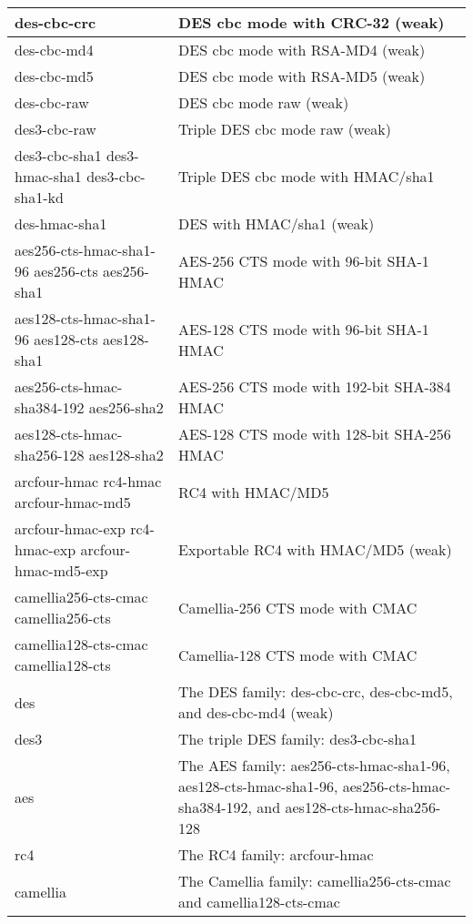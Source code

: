 \documentclass[letterpaper,10pt,english]{sphinxmanual}
\begin{document}
\begin{tabulary}{\linewidth}{|L|L|}
\hline

des-cbc-crc
 & 
DES cbc mode with CRC-32 (weak)
\\
\hline
des-cbc-md4
 & 
DES cbc mode with RSA-MD4 (weak)
\\
\hline
des-cbc-md5
 & 
DES cbc mode with RSA-MD5 (weak)
\\
\hline
des-cbc-raw
 & 
DES cbc mode raw (weak)
\\
\hline
des3-cbc-raw
 & 
Triple DES cbc mode raw (weak)
\\
\hline
des3-cbc-sha1 des3-hmac-sha1 des3-cbc-sha1-kd
 & 
Triple DES cbc mode with HMAC/sha1
\\
\hline
des-hmac-sha1
 & 
DES with HMAC/sha1 (weak)
\\
\hline
aes256-cts-hmac-sha1-96 aes256-cts aes256-sha1
 & 
AES-256 CTS mode with 96-bit SHA-1 HMAC
\\
\hline
aes128-cts-hmac-sha1-96 aes128-cts aes128-sha1
 & 
AES-128 CTS mode with 96-bit SHA-1 HMAC
\\
\hline
aes256-cts-hmac-sha384-192 aes256-sha2
 & 
AES-256 CTS mode with 192-bit SHA-384 HMAC
\\
\hline
aes128-cts-hmac-sha256-128 aes128-sha2
 & 
AES-128 CTS mode with 128-bit SHA-256 HMAC
\\
\hline
arcfour-hmac rc4-hmac arcfour-hmac-md5
 & 
RC4 with HMAC/MD5
\\
\hline
arcfour-hmac-exp rc4-hmac-exp arcfour-hmac-md5-exp
 & 
Exportable RC4 with HMAC/MD5 (weak)
\\
\hline
camellia256-cts-cmac camellia256-cts
 & 
Camellia-256 CTS mode with CMAC
\\
\hline
camellia128-cts-cmac camellia128-cts
 & 
Camellia-128 CTS mode with CMAC
\\
\hline
des
 & 
The DES family: des-cbc-crc, des-cbc-md5, and des-cbc-md4 (weak)
\\
\hline
des3
 & 
The triple DES family: des3-cbc-sha1
\\
\hline
aes
 & 
The AES family: aes256-cts-hmac-sha1-96, aes128-cts-hmac-sha1-96, aes256-cts-hmac-sha384-192, and aes128-cts-hmac-sha256-128
\\
\hline
rc4
 & 
The RC4 family: arcfour-hmac
\\
\hline
camellia
 & 
The Camellia family: camellia256-cts-cmac and camellia128-cts-cmac
\\
\hline\end{tabulary}
\end{document}
